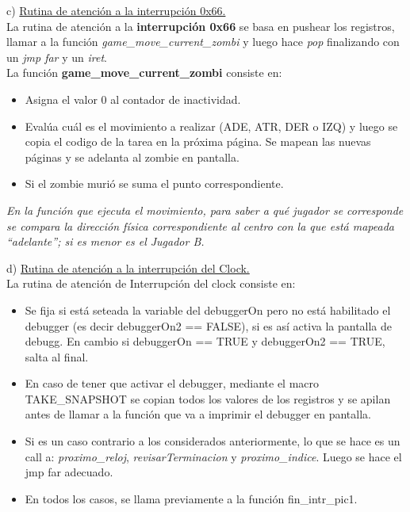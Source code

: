 \documentclass[a4paper]{article}
\begin{document}
\bigskip

{\large c)} \underline{Rutina de atenci\'on a la interrupci\'on 0x66.}\\

La rutina de atenci\'on a la \textbf{interrupci\'on 0x66 }se basa en pushear los registros, llamar a la funci\'on \textit{game_move_current_zombi} y luego hace \textit{pop} finalizando con un \textit{jmp far} y un\textit{ iret}.\\

La funci\'on \textbf{game_move_current_zombi} consiste en:

\begin{itemize}
\item Asigna el valor 0 al contador de inactividad.
\item Eval\'ua cu\'al es el movimiento a realizar (ADE, ATR, DER o IZQ) y luego se copia el codigo de la tarea en la pr\'oxima p\'agina. Se mapean las nuevas p\'aginas y se adelanta al zombie en pantalla.
\item Si el zombie muri\'o se suma el punto correspondiente.
\end{itemize}

\textit{
En la funci\'on que ejecuta el movimiento, para saber a qu\'e jugador se corresponde se compara la direcci\'on f\'isica correspondiente al centro con la que est\'a mapeada ``adelante''; si es menor es el Jugador B.\\}



\newpage
{\large d)} \underline{Rutina de atenci\'on a la interrupci\'on del Clock.}\\

La rutina de atenci\'on de Interrupci\'on del clock consiste en:

\begin{itemize}
\item Se fija si est\'a seteada la variable del debuggerOn pero no est\'a habilitado el debugger (es decir debuggerOn2 == FALSE), si es as\'i activa la pantalla de debugg. En cambio si debuggerOn == TRUE y debuggerOn2 == TRUE, salta al final.
\item En caso de tener que activar el debugger, mediante el macro TAKE_SNAPSHOT se copian todos los valores de los registros y se apilan antes de llamar a la funci\'on que va a imprimir el debugger en pantalla.
\item Si es un caso contrario a los considerados anteriormente, lo que se hace es un call a: \textit{proximo_reloj}, \textit{revisarTerminacion} y \textit{proximo_indice}. Luego se hace el jmp far adecuado.
\item En todos los casos, se llama previamente a la funci\'on fin_intr_pic1.
\end{itemize}
\end{document}
